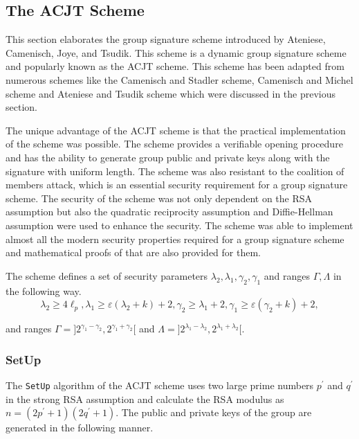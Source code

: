 \subsection{The ACJT Scheme}\label{ACJT}
This section elaborates the group signature scheme introduced by Ateniese, Camenisch, Joye, and Tsudik\cite{ateniese2000practical}. This scheme is a dynamic group signature scheme and popularly known as the ACJT scheme. This scheme has been adapted from numerous schemes like the Camenisch and Stadler scheme\cite{camenisch1997efficient}, Camenisch and Michel scheme\cite{camenisch1998group} and Ateniese and Tsudik scheme\cite{ateniese1999group} which were discussed in the previous section. 

The unique advantage of the ACJT scheme is that the practical implementation of the scheme was possible. The scheme provides a verifiable opening procedure and has the ability to generate group public and private keys along with the signature with uniform length. The scheme was also resistant to the coalition of members attack, which is an essential security requirement for a group signature scheme. The security of the scheme was not only dependent on the RSA assumption but also the quadratic reciprocity assumption and Diffie-Hellman assumption were used to enhance the security. The scheme was able to implement almost all the modern security properties required for a group signature scheme and mathematical proofs of that are also provided for them. 

The scheme defines a set of security parameters $\lambda_2, \lambda_1, \gamma_2, \gamma_1$ and ranges $\Gamma, \Lambda$ in the following way.
\[
\lambda_2 \geq 4\ell_p, 
\lambda_1 \geq \varepsilon(\lambda_2 + k) + 2 , 
\gamma_2 \geq \lambda_1 + 2 , 
\gamma_1 \geq \varepsilon(\gamma_2 + k)+ 2 ,
\]
\begin{center}
and ranges $\Gamma = ]2^{\gamma_1-\gamma_2}, 2^{\gamma_1+\gamma_2}[$ and 
		   $\Lambda = ]2^{\lambda_1-\lambda_2}, 2^{\lambda_1+\lambda_2}[$.
\end{center}

\subsubsection{SetUp}
The \texttt{SetUp} algorithm of the ACJT scheme uses two large prime numbers $p^\prime$ and $q^\prime$ in the strong RSA assumption and calculate the RSA modulus as $n = (2p^\prime + 1)(2q^\prime + 1)$. The public and private keys of the group are generated in the following manner.

